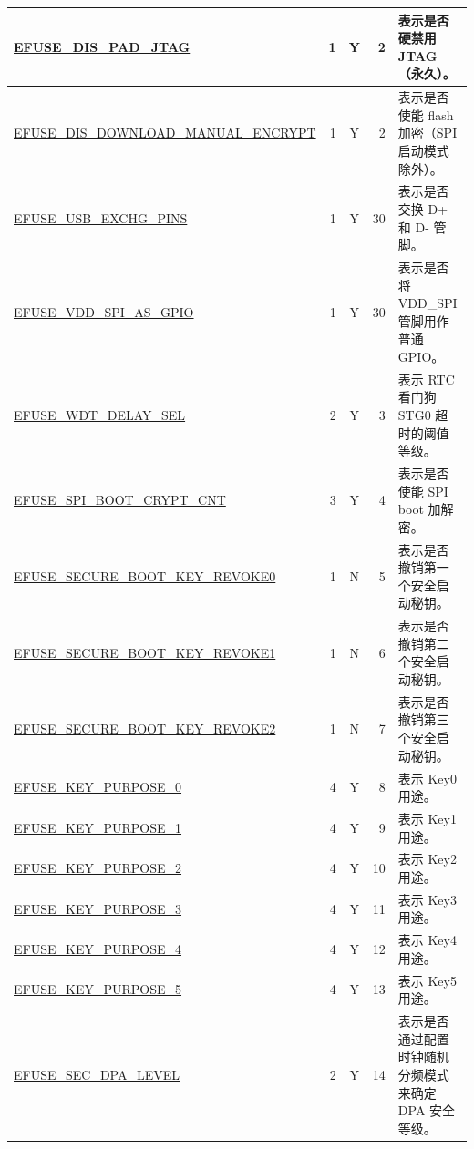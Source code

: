 \begin{longtable}[l]{ |m{8.2cm}|r|c|r|m{9.3cm}| }
    \hline
    \hyperref[fielddesc:EFUSEDISPADJTAG]{EFUSE\_DIS\_PAD\_JTAG} & 1 & Y & 2 & 表示是否硬禁用 JTAG（永久）。\\
    \hline
    \hyperref[fielddesc:EFUSEDISDOWNLOADMANUALENCRYPT]{EFUSE\_DIS\_DOWNLOAD\_MANUAL\_ENCRYPT} &  1 & Y & 2 & 表示是否使能 flash 加密（SPI 启动模式除外）。\\
    \hline
    \hyperref[fielddesc:EFUSEUSBEXCHGPINS]{EFUSE\_USB\_EXCHG\_PINS} & 1 & Y & 30 & 表示是否交换 D+ 和 D- 管脚。\\
    \hline
    \hyperref[fielddesc:EFUSEVDDSPIASGPIO]{EFUSE\_VDD\_SPI\_AS\_GPIO} & 1 & Y & 30 & 表示是否将 VDD\_SPI 管脚用作普通 GPIO。\\
    \hline
    \hyperref[fielddesc:EFUSEWDTDELAYSEL]{EFUSE\_WDT\_DELAY\_SEL} & 2 & Y & 3 & 表示 RTC 看门狗 STG0 超时的阈值等级。\\
    \hline
    \hyperref[fielddesc:EFUSESPIBOOTCRYPTCNT]{EFUSE\_SPI\_BOOT\_CRYPT\_CNT} & 3 & Y & 4 & 表示是否使能 SPI boot 加解密。\\
    \hline
    \hyperref[fielddesc:EFUSESECUREBOOTKEYREVOKE0]{EFUSE\_SECURE\_BOOT\_KEY\_REVOKE0} & 1 & N & 5 & 表示是否撤销第一个安全启动秘钥。\\
    \hline
    \hyperref[fielddesc:EFUSESECUREBOOTKEYREVOKE1]{EFUSE\_SECURE\_BOOT\_KEY\_REVOKE1} & 1 & N & 6 & 表示是否撤销第二个安全启动秘钥。\\
    \hline
    \hyperref[fielddesc:EFUSESECUREBOOTKEYREVOKE2]{EFUSE\_SECURE\_BOOT\_KEY\_REVOKE2} & 1 & N & 7 & 表示是否撤销第三个安全启动秘钥。\\
    \hline
    \hyperref[fielddesc:EFUSEKEYPURPOSE0]{EFUSE\_KEY\_PURPOSE\_0} & 4 & Y & 8 & 表示 Key0 用途。\\
    \hline
    \hyperref[fielddesc:EFUSEKEYPURPOSE1]{EFUSE\_KEY\_PURPOSE\_1} & 4 & Y & 9 & 表示 Key1 用途。\\
    \hline
    \hyperref[fielddesc:EFUSEKEYPURPOSE2]{EFUSE\_KEY\_PURPOSE\_2} & 4 & Y & 10 & 表示 Key2 用途。\\
    \hline
    \hyperref[fielddesc:EFUSEKEYPURPOSE3]{EFUSE\_KEY\_PURPOSE\_3} & 4 & Y & 11 & 表示 Key3 用途。\\
    \hline
    \hyperref[fielddesc:EFUSEKEYPURPOSE4]{EFUSE\_KEY\_PURPOSE\_4} & 4 & Y & 12 & 表示 Key4 用途。\\
    \hline
    \hyperref[fielddesc:EFUSEKEYPURPOSE5]{EFUSE\_KEY\_PURPOSE\_5} & 4 & Y & 13 & 表示 Key5 用途。\\
    \hline
    \hyperref[fielddesc:EFUSESECDPALEVEL]{EFUSE\_SEC\_DPA\_LEVEL} & 2 & Y & 14 & 表示是否通过配置时钟随机分频模式来确定 DPA 安全等级。\\

\end{longtable}
